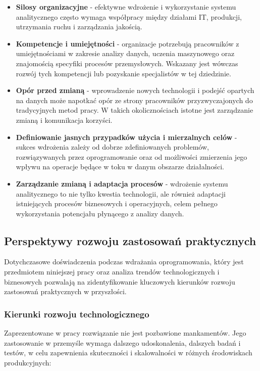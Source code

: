 \begin{itemize}
    \item \textbf{Silosy organizacyjne} - efektywne wdrożenie i wykorzystanie systemu analitycznego często wymaga współpracy między działami IT, produkcji, utrzymania ruchu i zarządzania jakością.
    \item \textbf{Kompetencje i umiejętności} - organizacje potrzebują pracowników z umiejętnościami w zakresie analizy danych, uczenia maszynowego oraz znajomością specyfiki procesów przemysłowych. Wskazany jest wówczas rozwój tych kompetencji lub pozyskanie specjalistów w tej dziedzinie.
    \item \textbf{Opór przed zmianą} - wprowadzenie nowych technologii i podejść opartych na danych może napotkać opór ze strony pracowników przyzwyczajonych do tradycyjnych metod pracy. W takich okolicznościach istotne jest zarządzanie zmianą i komunikacja korzyści.
    \item \textbf{Definiowanie jasnych przypadków użycia i mierzalnych celów} - sukces wdrożenia zależy od dobrze zdefiniowanych problemów, rozwiązywanych przez oprogramowanie oraz od możliwości zmierzenia jego wpływu na operacje będące w toku w danym obszarze działalności.
    \item \textbf{Zarządzanie zmianą i adaptacja procesów} - wdrożenie systemu analitycznego to nie tylko kwestia technologii, ale również adaptacji istniejących procesów biznesowych i operacyjnych, celem pełnego wykorzystania potencjału płynącego z analizy danych.
\end{itemize}

\subsection{Perspektywy rozwoju zastosowań praktycznych}
\label{subsec:perspektywy_rozwoju}

Dotychczasowe doświadczenia podczas wdrażania oprogramowania, który jest przedmiotem niniejszej pracy oraz analiza trendów technologicznych i biznesowych pozwalają na zidentyfikowanie kluczowych kierunków rozwoju zastosowań praktycznych w przyszłości.

\subsubsection{Kierunki rozwoju technologicznego}
\label{subsubsec:kierunki_rozwoju_tech}

Zaprezentowane w pracy rozwiązanie nie jest pozbawione mankamentów. Jego zastosowanie w przemyśle wymaga dalszego udoskonalenia, dalszych badań i testów, w celu zapewnienia skuteczności i skalowalności w różnych środowiskach produkcyjnych:

